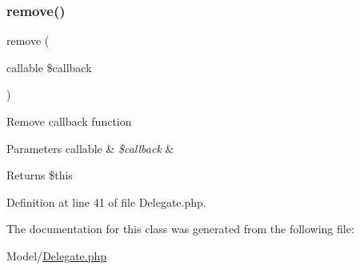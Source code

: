 \subsubsection{\texorpdfstring{remove()}{remove()}}
{\footnotesize\ttfamily remove (\begin{DoxyParamCaption}\item[{callable}]{\$callback }\end{DoxyParamCaption})}

Remove callback function 
\begin{DoxyParams}[1]{Parameters}
callable & {\em \$callback} & \\
\hline
\end{DoxyParams}
\begin{DoxyReturn}{Returns}
\$this 
\end{DoxyReturn}


Definition at line 41 of file Delegate.\+php.



The documentation for this class was generated from the following file\+:\begin{DoxyCompactItemize}
\item 
Model/\hyperlink{_delegate_8php}{Delegate.\+php}\end{DoxyCompactItemize}
